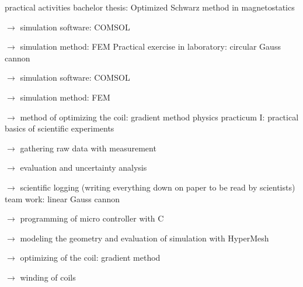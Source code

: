 \versionLanguageStart%
\begin{rubric}{\textcolor{black!20!blue!100}{practical activities}}%
		\entry*[\hphantom{00/0000 --- 00/}2016]
			bachelor thesis: Optimized Schwarz method in magnetostatics
			
			\setlength{\hangindent}{\widthof{$\rightarrow$ }}
			$\rightarrow$ simulation software: COMSOL
			
			$\rightarrow$ simulation method: FEM
		\entry*[\hfill 2015]
			Practical exercise in laboratory: circular Gauss cannon
			
			\setlength{\hangindent}{\widthof{$\rightarrow$ }}
			$\rightarrow$ simulation software: COMSOL
			
			$\rightarrow$ simulation method: FEM
			
			$\rightarrow$ method of optimizing the coil: gradient method
		\entry*[\hfill 2015]
			physics practicum I: practical basics of scientific experiments
			
			\setlength{\hangindent}{\widthof{$\rightarrow$ }}
			$\rightarrow$ gathering raw data with measurement
			
			$\rightarrow$ evaluation and uncertainty analysis
			
			$\rightarrow$ scientific logging (writing everything down on paper to be read by scientists)
		\entry*[\hfill 2014]
			team work: linear Gauss cannon
			
			\setlength{\hangindent}{\widthof{$\rightarrow$ }}
			$\rightarrow$ programming of micro controller with C
			
			$\rightarrow$ modeling the geometry and evaluation of simulation with HyperMesh
			
			$\rightarrow$ optimizing of the coil: gradient method
			
			$\rightarrow$ winding of coils
\end{rubric}
\versionLanguageEnd